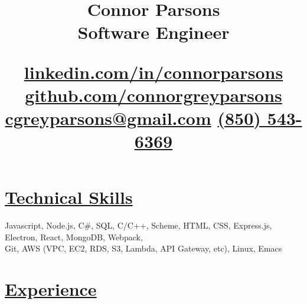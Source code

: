 \documentclass[11pt]{article}
\date{}
\title{\vspace{-4ex}\textbf{Connor Parsons}\\\medskip
\large Software Engineer\\\begin{normalsize}\href{https:linkedin.com/in/connorparsons}{linkedin.com/in/connorparsons} \textbullet{} \href{https:github.com/connorgreyparsons}{github.com/connorgreyparsons} \textbullet{} \href{mailto:cgreyparsons@gmail.com}{cgreyparsons@gmail.com} \textbullet{} \href{tel:8505436369}{(850) 543-6369}\vspace{-12ex}\end{normalsize}}
\begin{document}
\maketitle

\section*{\underline{Technical Skills}}
\label{sec:orgea01e3b}
Javascript, Node.js, C\#, SQL, C/C++, Scheme, HTML, CSS, Express.js, Electron, React, MongoDB, Webpack,
\\Git, AWS (VPC, EC2, RDS, S3, Lambda, API Gateway, etc), Linux, Emacs

\section*{\underline{Experience}}
\label{sec:orgfbdc088}
\end{document}
